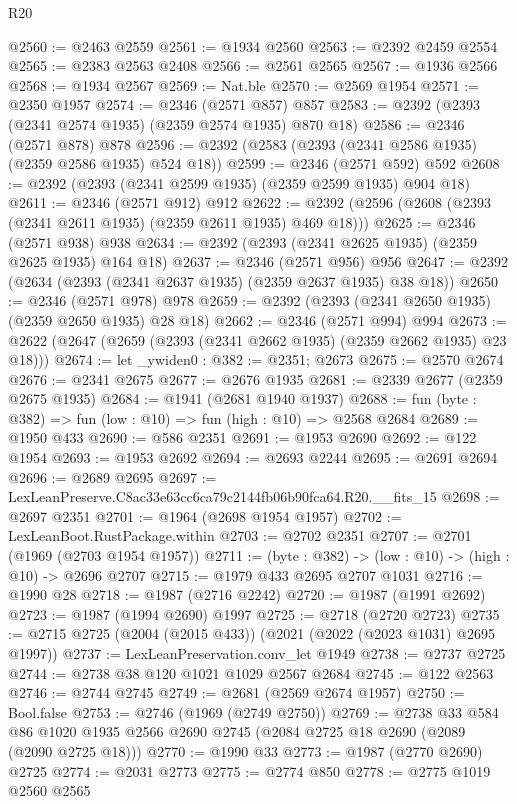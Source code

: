 \begin{lexlean}{R20}
\begin{coremodule}
@2560 := @2463 @2559
@2561 := @1934 @2560
@2563 := @2392 @2459 @2554
@2565 := @2383 @2563 @2408
@2566 := @2561 @2565
@2567 := @1936 @2566
@2568 := @1934 @2567
@2569 := Nat.ble
@2570 := @2569 @1954
@2571 := @2350 @1957
@2574 := @2346 (@2571 @857) @857
@2583 := @2392 (@2393 (@2341 @2574 @1935) (@2359 @2574 @1935) @870 @18)
@2586 := @2346 (@2571 @878) @878
@2596 := @2392 (@2583 (@2393 (@2341 @2586 @1935) (@2359 @2586 @1935) @524 @18))
@2599 := @2346 (@2571 @592) @592
@2608 := @2392 (@2393 (@2341 @2599 @1935) (@2359 @2599 @1935) @904 @18)
@2611 := @2346 (@2571 @912) @912
@2622 := @2392 (@2596 (@2608 (@2393 (@2341 @2611 @1935) (@2359 @2611 @1935) @469 @18)))
@2625 := @2346 (@2571 @938) @938
@2634 := @2392 (@2393 (@2341 @2625 @1935) (@2359 @2625 @1935) @164 @18)
@2637 := @2346 (@2571 @956) @956
@2647 := @2392 (@2634 (@2393 (@2341 @2637 @1935) (@2359 @2637 @1935) @38 @18))
@2650 := @2346 (@2571 @978) @978
@2659 := @2392 (@2393 (@2341 @2650 @1935) (@2359 @2650 @1935) @28 @18)
@2662 := @2346 (@2571 @994) @994
@2673 := @2622 (@2647 (@2659 (@2393 (@2341 @2662 @1935) (@2359 @2662 @1935) @23 @18)))
@2674 := let _ywiden0 : @382 := @2351; @2673
@2675 := @2570 @2674
@2676 := @2341 @2675
@2677 := @2676 @1935
@2681 := @2339 @2677 (@2359 @2675 @1935)
@2684 := @1941 (@2681 @1940 @1937)
@2688 := fun (byte : @382) => fun (low : @10) => fun (high : @10) => @2568 @2684
@2689 := @1950 @433
@2690 := @586 @2351
@2691 := @1953 @2690
@2692 := @122 @1954
@2693 := @1953 @2692
@2694 := @2693 @2244
@2695 := @2691 @2694
@2696 := @2689 @2695
@2697 := LexLeanPreserve.C8ac33e63cc6ca79c2144fb06b90fca64.R20.__fits_15
@2698 := @2697 @2351
@2701 := @1964 (@2698 @1954 @1957)
@2702 := LexLeanBoot.RustPackage.within
@2703 := @2702 @2351
@2707 := @2701 (@1969 (@2703 @1954 @1957))
@2711 := (byte : @382) -> (low : @10) -> (high : @10) -> @2696 @2707
@2715 := @1979 @433 @2695 @2707 @1031
@2716 := @1990 @28
@2718 := @1987 (@2716 @2242)
@2720 := @1987 (@1991 @2692)
@2723 := @1987 (@1994 @2690) @1997
@2725 := @2718 (@2720 @2723)
@2735 := @2715 @2725 (@2004 (@2015 @433)) (@2021 (@2022 (@2023 @1031) @2695 @1997))
@2737 := LexLeanPreservation.conv_let @1949
@2738 := @2737 @2725
@2744 := @2738 @38 @120 @1021 @1029 @2567 @2684
@2745 := @122 @2563
@2746 := @2744 @2745
@2749 := @2681 (@2569 @2674 @1957)
@2750 := Bool.false
@2753 := @2746 (@1969 (@2749 @2750))
@2769 := @2738
    @33
    @584
    @86
    @1020
    @1935
    @2566
    @2690
    @2745
    (@2084 @2725 @18 @2690 (@2089 (@2090 @2725 @18)))
@2770 := @1990 @33
@2773 := @1987 (@2770 @2690) @2725
@2774 := @2031 @2773
@2775 := @2774 @850
@2778 := @2775 @1019 @2560 @2565

\end{coremodule}
\end{lexlean}
